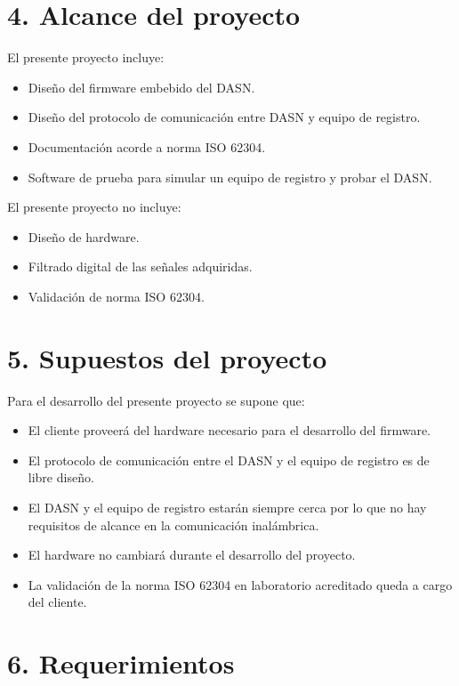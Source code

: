 \documentclass[
11pt, %
codirector, %
]{charter}
\begin{document}
\section{4. Alcance del proyecto}
\label{sec:alcance}

El presente proyecto incluye:
\begin{itemize}
	\item Diseño del firmware embebido del DASN.
	\item Diseño del protocolo de comunicación entre DASN y equipo de registro.
	\item Documentación acorde a norma ISO 62304.
	\item Software de prueba para simular un equipo de registro y probar el DASN.
\end{itemize}

El presente proyecto no incluye:
\begin{itemize}
	\item Diseño de hardware.
	\item Filtrado digital de las señales adquiridas.
	\item Validación de norma ISO 62304.
\end{itemize}


\section{5. Supuestos del proyecto}
\label{sec:supuestos}

Para el desarrollo del presente proyecto se supone que:
\begin{itemize}
	\item El cliente proveerá del hardware necesario para el desarrollo del firmware.
	\item El protocolo de comunicación entre el DASN y el equipo de registro es de libre diseño.
	\item El DASN y el equipo de registro estarán siempre cerca por lo que no hay requisitos de alcance en la comunicación inalámbrica.
	\item El hardware no cambiará durante el desarrollo del proyecto.
	\item La validación de la norma ISO 62304 en laboratorio acreditado queda a cargo del cliente.
\end{itemize}

\section{6. Requerimientos}
\label{sec:requerimientos}
\end{document}
